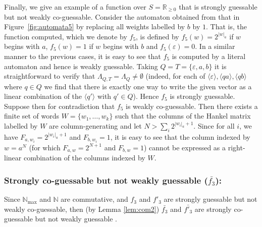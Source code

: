 \documentclass{lmcs}
\numberwithin{theorem}{section}
\begin{document}
	Finally, we give an example of a function over $S=\mathbb{R}_{\geq 0}$ that is strongly guessable but not weakly co-guessable. Consider the automaton obtained from that in Figure~\ref{fig:automata5} by replacing all weights labelled by $b$ by $1$. That is, the function computed, which we denote by $f_5$, is defined by $f_5(w) = 2^{|w|_a}$ if $w$ begins with $a$,  $f_5(w) = 1$ if $w$ begins with $b$ and $f_5(\varepsilon) =0$. In a similar manner to the previous cases, it is easy to see that $f_5$ is computed by a literal automaton and hence is weakly guessable.  Taking $Q=T=\{\varepsilon, a, b\}$ it is straightforward to verify that $\Lambda_{Q, T} = \Lambda_Q \neq \emptyset$ (indeed, for each of $\langle \varepsilon \rangle, \langle q a\rangle, \langle qb \rangle$ where $q \in Q$ we find that there is exactly one way to write the given vector as a linear combination of the $\langle q' \rangle$ with $q' \in Q$). Hence $f_5$ is strongly guessable. Suppose then for contradiction that $f_5$ is weakly co-guessable. Then there exists a finite set of words $W=\{w_1, \ldots ,w_k\}$ such that the columns of the Hankel matrix labelled by $W$ are column-generating and let $N> \sum_i2^{|w_i|_a + 1}$. Since for all $i$, we have $F_{a, w_i} = 2^{|w_i|_a + 1}$ and $F_{b, w_i} = 1$, it is easy to see that the column indexed by $w = a^N$ (for which $F_{a, w} = 2^{N+1}$ and $F_{b, w} = 1$) cannot be expressed as a right-linear combination of the columns indexed by $W$.
	
	
		\subsubsection*{\textbf{Strongly co-guessable but not weakly guessable ($\bar{f_3}$):}}
		Since $\mathbb{N}_{\max}$ and $\mathbb{N}$ are commutative, and $f_3$ and $f'_3$ are strongly guessable but not weakly co-guessable, then (by Lemma \ref{lem:com2}) $\bar{f_3}$ and $\bar{f'_3}$ are strongly co-guessable but not weakly guessable .
\end{document}
